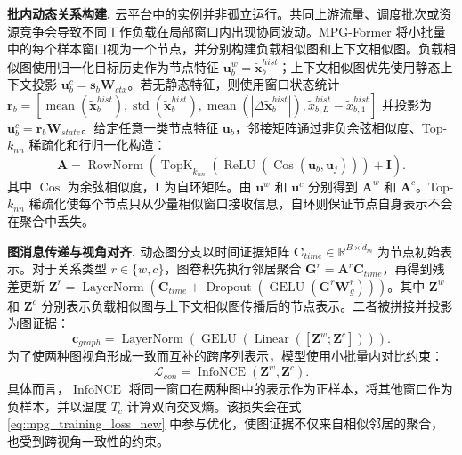 \documentclass[UTF8]{ctexart}
\begin{document}
\noindent\textbf{批内动态关系构建.}
云平台中的实例并非孤立运行。共同上游流量、调度批次或资源竞争会导致不同工作负载在局部窗口内出现协同波动。MPG-Former 将小批量中的每个样本窗口视为一个节点，并分别构建负载相似图和上下文相似图。负载相似图使用归一化目标历史作为节点特征 $\mathbf u^w_b=\tilde{\mathbf x}^{hist}_b$；上下文相似图优先使用静态上下文投影 $\mathbf u^c_b=\mathbf s_b\mathbf W_{ctx}$。若无静态特征，则使用窗口状态统计 $\mathbf r_b=[\operatorname{mean}(\tilde{\mathbf x}^{hist}_b),\operatorname{std}(\tilde{\mathbf x}^{hist}_b),\operatorname{mean}(|\Delta \tilde{\mathbf x}^{hist}_b|),\tilde{x}^{hist}_{b,L}-\tilde{x}^{hist}_{b,1}]$ 并投影为 $\mathbf u^c_b=\mathbf r_b\mathbf W_{state}$。给定任意一类节点特征 $\mathbf u_b$，邻接矩阵通过非负余弦相似度、Top-$k_{nn}$ 稀疏化和行归一化构造：
\begin{equation}
    \mathbf A=\operatorname{RowNorm}\!\left(\operatorname{TopK}_{k_{nn}}(\operatorname{ReLU}(\operatorname{Cos}(\mathbf u_b,\mathbf u_j)))+\mathbf I\right).
    \label{eq:mpg_adj_new}
\end{equation}
其中 $\operatorname{Cos}$ 为余弦相似度，$\mathbf I$ 为自环矩阵。由 $\mathbf u^w$ 和 $\mathbf u^c$ 分别得到 $\mathbf A^w$ 和 $\mathbf A^c$。Top-$k_{nn}$ 稀疏化使每个节点只从少量相似窗口接收信息，自环则保证节点自身表示不会在聚合中丢失。

\noindent\textbf{图消息传递与视角对齐.}
动态图分支以时间证据矩阵 $\mathbf C_{time}\in\mathbb R^{B\times d_m}$ 为节点初始表示。对于关系类型 $r\in\{w,c\}$，图卷积先执行邻居聚合 $\mathbf G^r=\mathbf A^r\mathbf C_{time}$，再得到残差更新 $\mathbf Z^r=\operatorname{LayerNorm}(\mathbf C_{time}+\operatorname{Dropout}(\operatorname{GELU}(\mathbf G^r\mathbf W_g^r)))$。其中 $\mathbf Z^w$ 和 $\mathbf Z^c$ 分别表示负载相似图与上下文相似图传播后的节点表示。二者被拼接并投影为图证据：
\begin{equation}
    \mathbf c_{graph}=\operatorname{LayerNorm}\!\left(\operatorname{GELU}(\operatorname{Linear}([\mathbf Z^{w};\mathbf Z^{c}]))\right).
    \label{eq:mpg_graph_context_new}
\end{equation}
为了使两种图视角形成一致而互补的跨序列表示，模型使用小批量内对比约束：
\begin{equation}
    \mathcal L_{con}=\operatorname{InfoNCE}(\mathbf Z^{w},\mathbf Z^{c}).
    \label{eq:mpg_contrast_new}
\end{equation}
具体而言，$\operatorname{InfoNCE}$ 将同一窗口在两种图中的表示作为正样本，将其他窗口作为负样本，并以温度 $T_c$ 计算双向交叉熵。该损失会在式 \eqref{eq:mpg_training_loss_new} 中参与优化，使图证据不仅来自相似邻居的聚合，也受到跨视角一致性的约束。
\end{document}
